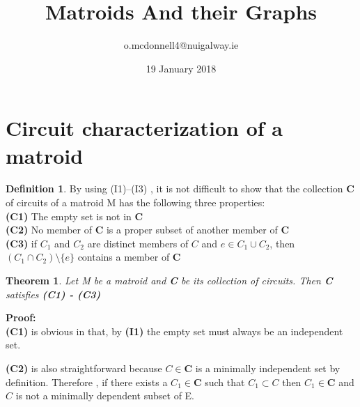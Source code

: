 \documentclass{article}
\title{Matroids And their Graphs}
\author{o.mcdonnell4@nuigalway.ie }
\date{19 January 2018}
\theoremstyle{plain}
\newtheorem{thm}{Theorem}[section]
\theoremstyle{definition}
\newtheorem{defn}{Definition}[section]
\theoremstyle{remark}
\newcommand\Proof{%
    \textbf{Proof:}~%
}
\begin{document}
\maketitle
 
 \section{Circuit characterization of a matroid}

\begin{defn} By using (I1)–(I3) , it is not difficult to show that the collection \textbf{C} of circuits of a matroid M has the following three properties:\\
\textbf{(C1)} The empty set is not in \textbf{C}\\
\textbf{(C2)} No member of \textbf{C} is a proper subset of another member of \textbf{C}\\
\textbf{(C3)} if $ C_1 $ and $ C_2 $ are distinct members of $ C $ and 
$ e \in C_1 \cup C_2 $, then $ (C_1 \cap C_2 ) \setminus \{e\} $ contains a member of \textbf{C} 
 \end{defn}
 
 \vspace{5mm}
 
 \begin{thm}
 Let M be a matroid and \textbf{C} be its collection of circuits. Then \textbf{C} satisfies \textbf{(C1) - (C3)}
  \end{thm}
 
 \noindent\textbf\Proof \\
 \noindent \textbf{(C1)} is obvious in that, by \textbf{(I1)} the empty set must always be an independent set.
 
 \vspace{2mm}
 
 \noindent \textbf{(C2)} is also straightforward because $ C \in \textbf{C} $ is a minimally independent set by definition. Therefore , if there exists a $ C_1 \in \textbf{C} $ such that $ C_1 \subset C $ then $ C_1 \in \textbf{C} $ and $ C $ is not a minimally dependent subset of E. 
\end{document}
